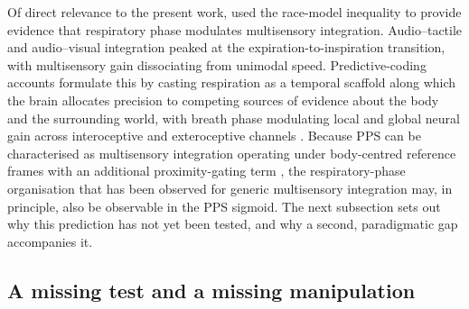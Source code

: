 Of direct relevance to the present work, \citet{saltafossi_2025} used the race-model inequality to provide evidence that respiratory phase modulates multisensory integration. Audio--tactile and audio--visual integration peaked at the expiration-to-inspiration transition, with multisensory gain dissociating from unimodal speed. Predictive-coding accounts formulate this by casting respiration as a temporal scaffold along which the brain allocates precision to competing sources of evidence about the body and the surrounding world, with breath phase modulating local and global neural gain across interoceptive and exteroceptive channels \citep{allen_2021, braendholt_2023, engelen_2023}. Because PPS can be characterised as multisensory integration operating under body-centred reference frames with an additional proximity-gating term \citep{noel_2018, bertoni_2025, noel_2021}, the respiratory-phase organisation that has been observed for generic multisensory integration may, in principle, also be observable in the PPS sigmoid. The next subsection sets out why this prediction has not yet been tested, and why a second, paradigmatic gap accompanies it.

\subsection{A missing test and a missing manipulation}


